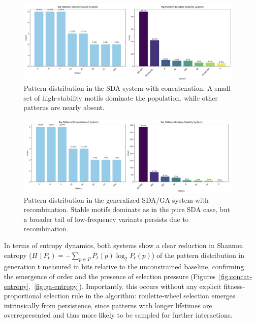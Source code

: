 \documentclass[life,article,submit,pdftex,moreauthors]{Definitions/mdpi}
\begin{document}
\begin{figure}[H]
    \centering
    \includegraphics[width=1\textwidth]{SDA-concat-patterns.png}
    \caption{Pattern distribution in the SDA system with concatenation. A small set of high-stability motifs dominate the population, while other patterns are nearly absent.}
    \label{fig:concat-patterns}
\end{figure}

\begin{figure}[H]
    \centering
    \includegraphics[width=1\textwidth]{SDA-GA-patterns.png}
    \caption{Pattern distribution in the generalized SDA/GA system with recombination. Stable motifs dominate as in the pure SDA case, but a broader tail of low-frequency variants persists due to recombination.}
    \label{fig:ga-patterns}
\end{figure}

In terms of entropy dynamics, both systems show a clear reduction in Shannon entropy ($H(P_t) = - \sum_{p \in P} P_t(p) \log_2 P_t(p)$) of
the pattern distribution in generation t measured in bits relative to the unconstrained baseline, confirming the emergence of order and the presence of selection pressure (Figures~\ref{fig:concat-entropy},~\ref{fig:ga-entropy}). Importantly, this occurs without any explicit fitness-proportional selection rule in the algorithm: roulette-wheel selection emerges intrinsically from persistence, since patterns with longer lifetimes are overrepresented and thus more likely to be sampled for further interactions.
\end{document}
